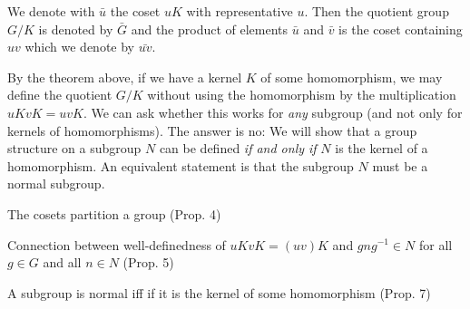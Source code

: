 We denote with $\bar{u}$ the coset $uK$ with representative $u$. Then the quotient group $G/K$ is denoted by $\bar{G}$ and the product of elements $\bar{u}$ and $\bar{v}$ is the coset containing $uv$ which we denote by $\bar{uv}$.


By the theorem above, if we have a kernel $K$ of some homomorphism, we may define the quotient $G/K$ without using the homomorphism by the multiplication $uKvK = uvK$. We can ask whether this works for \emph{any} subgroup (and not only for kernels of homomorphisms). The answer is no: We will show that a group structure on a subgroup $N$ can be defined \emph{if and only if} $N$ is the kernel of a homomorphism. An equivalent statement is that the subgroup $N$ must be a normal subgroup.





The cosets partition a group (Prop. 4)

Connection between well-definedness of $uK vK = (uv)K$ and $gng^{-1} \in N$ for all $g \in G$ and all $n \in N$ (Prop. 5)

A subgroup is normal iff if it is the kernel of some homomorphism (Prop. 7)


